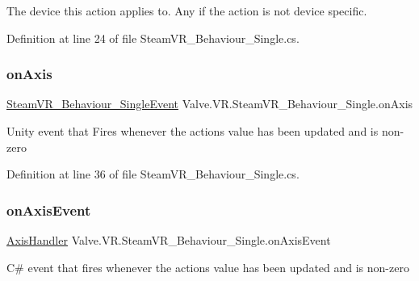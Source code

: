 The device this action applies to. Any if the action is not device specific. 



Definition at line 24 of file Steam\+V\+R\+\_\+\+Behaviour\+\_\+\+Single.\+cs.

\mbox{\label{class_valve_1_1_v_r_1_1_steam_v_r___behaviour___single_a38738e6004dda3a00cfadf0978ac868b}} 
\subsubsection{\texorpdfstring{onAxis}{onAxis}}
{\footnotesize\ttfamily \mbox{\hyperlink{class_valve_1_1_v_r_1_1_steam_v_r___behaviour___single_event}{Steam\+V\+R\+\_\+\+Behaviour\+\_\+\+Single\+Event}} Valve.\+V\+R.\+Steam\+V\+R\+\_\+\+Behaviour\+\_\+\+Single.\+on\+Axis}



Unity event that Fires whenever the action\textquotesingle{}s value has been updated and is non-\/zero 



Definition at line 36 of file Steam\+V\+R\+\_\+\+Behaviour\+\_\+\+Single.\+cs.

\mbox{\label{class_valve_1_1_v_r_1_1_steam_v_r___behaviour___single_ae2824c4a3db3be7858785c35c47d2544}} 
\subsubsection{\texorpdfstring{onAxisEvent}{onAxisEvent}}
{\footnotesize\ttfamily \mbox{\hyperlink{class_valve_1_1_v_r_1_1_steam_v_r___behaviour___single_ae61cad9d74c4df6b8efd9ead49b15ea9}{Axis\+Handler}} Valve.\+V\+R.\+Steam\+V\+R\+\_\+\+Behaviour\+\_\+\+Single.\+on\+Axis\+Event}



C\# event that fires whenever the action\textquotesingle{}s value has been updated and is non-\/zero 



